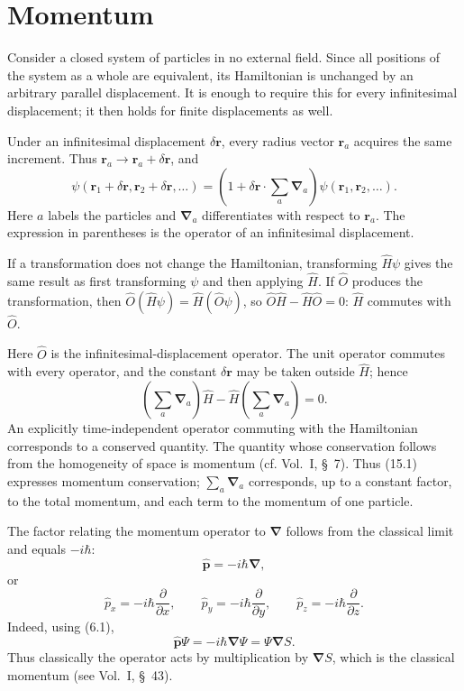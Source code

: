 \section{Momentum}

Consider a closed system of particles in no external field. Since all
positions of the system as a whole are equivalent, its Hamiltonian is unchanged
by an arbitrary parallel displacement. It is enough to require this for every
infinitesimal displacement; it then holds for finite displacements as well.

Under an infinitesimal displacement $\delta\mathbf r$, every radius vector
$\mathbf r_a$ acquires the same increment. Thus
$\mathbf r_a\to\mathbf r_a+\delta\mathbf r$, and
\[
 \psi(\mathbf r_1+\delta\mathbf r,\mathbf r_2+\delta\mathbf r,\ldots)
 =\left(1+\delta\mathbf r\cdot\sum_a\boldsymbol\nabla_a\right)
 \psi(\mathbf r_1,\mathbf r_2,\ldots).
\]
Here $a$ labels the particles and $\boldsymbol\nabla_a$ differentiates with
respect to $\mathbf r_a$. The expression in parentheses
is the operator of an infinitesimal displacement.

If a transformation does not change the Hamiltonian, transforming
$\hat H\psi$ gives the same result as first transforming $\psi$ and then
applying $\hat H$. If $\hat O$ produces the transformation, then
$\hat O(\hat H\psi)=\hat H(\hat O\psi)$, so
$\hat O\hat H-\hat H\hat O=0$: $\hat H$ commutes with $\hat O$.

Here $\hat O$ is the infinitesimal-displacement operator. The unit operator
commutes with every operator, and the constant $\delta\mathbf r$ may be taken
outside $\hat H$; hence
\begin{equation}
 \left(\sum_a\boldsymbol\nabla_a\right)\hat H
 -\hat H\left(\sum_a\boldsymbol\nabla_a\right)=0.
 \tag{15.1}
\end{equation}
An explicitly time-independent operator commuting with the Hamiltonian
corresponds to a conserved quantity. The quantity whose conservation follows
from the homogeneity of space is momentum (cf. Vol.~I, \S~7). Thus (15.1)
expresses momentum conservation; $\sum_a\boldsymbol\nabla_a$ corresponds, up
to a constant factor, to the total momentum, and each term to the momentum of
one particle.

The factor relating the momentum operator to $\boldsymbol\nabla$ follows from
the classical limit and equals $-i\hbar$:
\begin{equation}
 \hat{\mathbf p}=-i\hbar\boldsymbol\nabla,
 \tag{15.2}
\end{equation}
or
\[
 \hat p_x=-i\hbar\frac{\partial}{\partial x},\qquad
 \hat p_y=-i\hbar\frac{\partial}{\partial y},\qquad
 \hat p_z=-i\hbar\frac{\partial}{\partial z}.
\]
Indeed, using (6.1),
\[
 \hat{\mathbf p}\Psi=-i\hbar\boldsymbol\nabla\Psi
 =\Psi\boldsymbol\nabla S.
\]
Thus classically the operator acts by multiplication by
$\boldsymbol\nabla S$, which is the classical momentum (see Vol.~I, \S~43).

